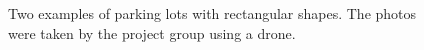 \begin{figure}[H]
  \centering
  \begin{subfigure}[b]{0.55\textwidth}
  \end{subfigure}
  \quad
  \begin{subfigure}[b]{0.335\textwidth}
  \end{subfigure}
  \caption{Two examples of parking lots with rectangular shapes. The photos were taken by the project group using a drone.}
  \label{fig:parkings}
\end{figure}

